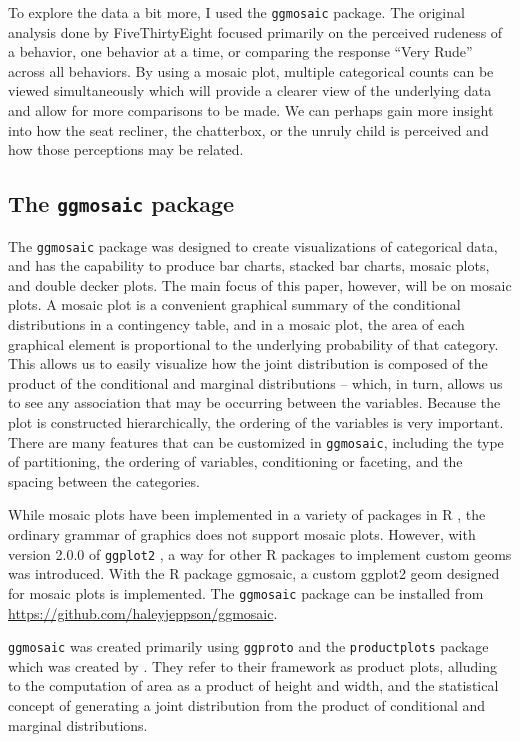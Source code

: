 To explore the data a bit more, I used the \texttt{ggmosaic} package.
The original analysis done by FiveThirtyEight focused primarily on the
perceived rudeness of a behavior, one behavior at a time, or comparing
the response ``Very Rude'' across all behaviors. By using a mosaic plot,
multiple categorical counts can be viewed simultaneously which will
provide a clearer view of the underlying data and allow for more
comparisons to be made. We can perhaps gain more insight into how the
seat recliner, the chatterbox, or the unruly child is perceived and how
those perceptions may be related.

\subsection{\texorpdfstring{The \texttt{ggmosaic}
package}{The  package}}\label{the-package}

The \texttt{ggmosaic} package was designed to create visualizations of
categorical data, and has the capability to produce bar charts, stacked
bar charts, mosaic plots, and double decker plots. The main focus of
this paper, however, will be on mosaic plots. A mosaic plot is a
convenient graphical summary of the conditional distributions in a
contingency table, and in a mosaic plot, the area of each graphical
element is proportional to the underlying probability of that category.
This allows us to easily visualize how the joint distribution is
composed of the product of the conditional and marginal distributions --
which, in turn, allows us to see any association that may be occurring
between the variables. Because the plot is constructed hierarchically,
the ordering of the variables is very important. There are many features
that can be customized in \texttt{ggmosaic}, including the type of
partitioning, the ordering of variables, conditioning or faceting, and
the spacing between the categories.

While mosaic plots have been implemented in a variety of packages in R
\citep{R2016}, the ordinary grammar of graphics does not support mosaic
plots. However, with version 2.0.0 of \texttt{ggplot2} \citep{ggplot2},
a way for other R packages to implement custom geoms was introduced.
With the R package ggmosaic, a custom ggplot2 geom designed for mosaic
plots is implemented. The \texttt{ggmosaic} package can be installed
from \url{https://github.com/haleyjeppson/ggmosaic}.

\texttt{ggmosaic} was created primarily using \texttt{ggproto} and the
\texttt{productplots} package which was created by
\citet{productplots, ieee-prodplots}. They refer to their framework as
product plots, alluding to the computation of area as a product of
height and width, and the statistical concept of generating a joint
distribution from the product of conditional and marginal distributions.

